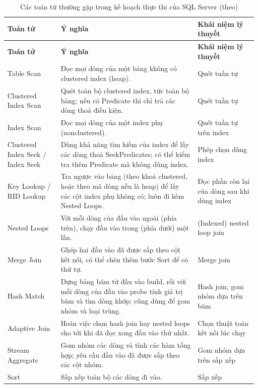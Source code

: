 \begin{longtable}{>{\raggedright\arraybackslash}p{3.3cm} >{\raggedright\arraybackslash}p{8.6cm} >{\raggedright\arraybackslash}p{3.6cm}}
    \caption{Các toán tử thường gặp trong kế hoạch thực thi của SQL Server (theo)}
    \label{tab:mssql-operators} \\
    \toprule
    \textbf{Toán tử} & \textbf{Ý nghĩa} & \textbf{Khái niệm lý thuyết} \\
    \midrule
    \endfirsthead
    \toprule
    \textbf{Toán tử} & \textbf{Ý nghĩa} & \textbf{Khái niệm lý thuyết} \\
    \midrule
    \endhead
    Table Scan & Đọc mọi dòng của một bảng không có clustered index (heap). & Quét tuần tự \\
    Clustered Index Scan & Quét toàn bộ clustered index, tức toàn bộ bảng; nếu có Predicate thì chỉ trả các dòng thoả điều kiện. & Quét tuần tự \\
    Index Scan & Đọc mọi dòng của một index phụ (nonclustered). & Quét tuần tự trên index \\
    Clustered Index Seek / Index Seek & Dùng khả năng tìm kiếm của index để lấy các dòng thoả SeekPredicates; có thể kiểm tra thêm Predicate mà không dùng index. & Phép chọn dùng index \\
    Key Lookup / RID Lookup & Tra ngược vào bảng (theo khoá clustered, hoặc theo mã dòng nếu là heap) để lấy các cột index phụ không có; luôn đi kèm Nested Loops. & Đọc phần còn lại của dòng sau khi dùng index \\
    \midrule
    Nested Loops & Với mỗi dòng của đầu vào ngoài (phía trên), chạy đầu vào trong (phía dưới) một lần. & (Indexed) nested loop join \\
    Merge Join & Ghép hai đầu vào đã được sắp theo cột kết nối, có thể chèn thêm bước Sort để có thứ tự. & Merge join \\
    Hash Match & Dựng bảng băm từ đầu vào build, rồi với mỗi dòng của đầu vào probe tính giá trị băm và tìm dòng khớp; cũng dùng để gom nhóm và loại trùng. & Hash join; gom nhóm dựa trên băm \\
    Adaptive Join & Hoãn việc chọn hash join hay nested loops cho tới khi đã đọc xong đầu vào thứ nhất. & Chọn thuật toán kết nối lúc chạy \\
    \midrule
    Stream Aggregate & Gom nhóm các dòng và tính các hàm tổng hợp; yêu cầu đầu vào đã được sắp theo các cột nhóm. & Gom nhóm dựa trên sắp xếp \\
    Sort & Sắp xếp toàn bộ các dòng đi vào. & Sắp xếp \\

\end{longtable}
